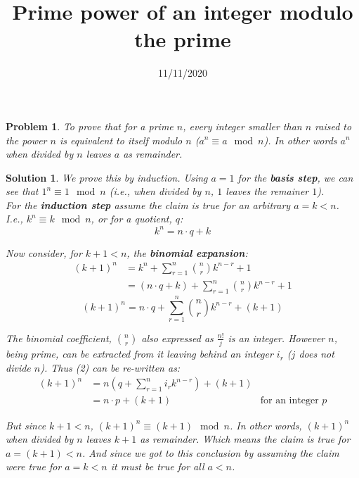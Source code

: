 \documentclass{article}
\title{Prime power of an integer modulo the prime}
\date{11/11/2020}
\newtheorem*{problem*}{Problem}
\newtheorem*{solution*}{Solution}
\begin{document}
\maketitle
 
\begin{problem*}
    To prove that for a prime $n$, every 
    integer smaller than $n$
    raised to the power $n$ is equivalent to itself
    modulo $n$ ($a^n \equiv a\mod{n}$).
    In other words $a^n$ when divided by $n$
    leaves $a$ as remainder.
\end{problem*}

\begin{solution*}
    We prove this by induction. Using $a=1$ for the 
    \textbf{basis step}, we can see that $1^n \equiv 1\mod{n}$
    (i.e., when divided by $n$, $1$ leaves the remainer $1$).\\

    For the \textbf{induction step} assume the claim is 
    true for an arbitrary $a=k<n$. I.e., $k^n \equiv k\mod{n}$, 
    or for a quotient, $q$:
    \begin{equation}
        k^n = n\cdot{q} + k
    \end{equation}

    Now consider, for $k+1<n$, the \textbf{binomial expansion}:
    \begin{align*}
        (k+1)^n
        &= k^n + \sum_{r=1}^{n}{n\choose{r}}k^{n-r} + 1\\
        &= (n\cdot{q} + k) + \sum_{r=1}^{n}{n\choose{r}}k^{n-r} + 1
    \end{align*}
    \begin{equation}
        (k+1)^n = n\cdot{q} + \sum_{r=1}^{n}{n\choose{r}}k^{n-r} + (k+1)
    \end{equation}
    
    The binomial coefficient, $n\choose{r}$
    also expressed as $\frac{n!}{j}$ is an integer.
    However $n$, being prime, can be extracted from 
    it leaving behind an integer $i_r$ ($j$ does not divide $n$).
    Thus (2) can be re-written as:
    \begin{align*}
        (k+1)^n
        &= n \left(q + \sum_{r=1}^{n}{i_r}k^{n-r} \right) + (k+1)\\
        &= n\cdot{p} + (k+1) & \text{for an integer $p$}
    \end{align*}

    But since $k+1<n$, $(k+1)^n \equiv (k+1)\mod{n}$. 
    In other words, $(k+1)^n$ when divided by $n$
    leaves $k+1$ as remainder. Which means the claim is
    true for $a=(k+1)<n$. And since we got to this conclusion
    by assuming the claim were true for $a=k<n$ 
    it must be true for all $a<n$.
\end{solution*}
\end{document}
